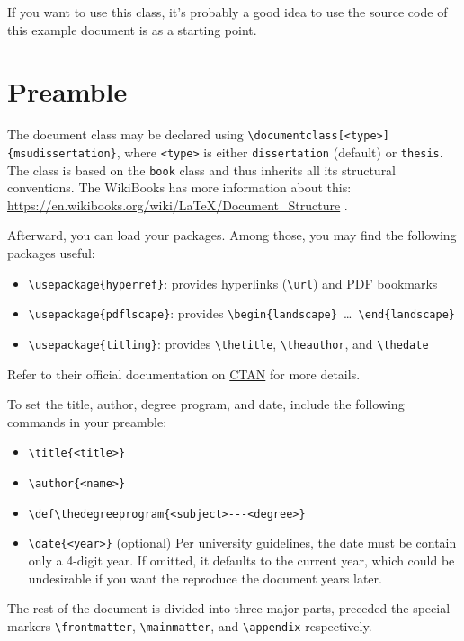\documentclass[dissertation]{msudissertation}
\def\thedegreeprogram{Underwater Basket Weaving---Doctor of Philosophy}
\begin{document}
If you want to use this class, it's probably a good idea to use the source code of this example document is as a starting point.

\section{Preamble}

The document class may be declared using \verb|\documentclass[<type>]{msudissertation}|, where \texttt{<type>} is either \texttt{dissertation} (default) or \texttt{thesis}.  The class is based on the \texttt{book} class and thus inherits all its structural conventions.  The WikiBooks has more information about this: \url{https://en.wikibooks.org/wiki/LaTeX/Document_Structure} .

Afterward, you can load your packages.  Among those, you may find the following packages useful:
\begin{itemize}
\item \verb|\usepackage{hyperref}|: provides hyperlinks (\verb|\url|) and PDF bookmarks
\item \verb|\usepackage{pdflscape}|: provides \verb|\begin{landscape} |\ldots\verb| \end{landscape}|
\item \verb|\usepackage{titling}|: provides \verb|\thetitle|, \verb|\theauthor|, and \verb|\thedate|
\end{itemize}
Refer to their official documentation on \href{https://www.ctan.org}{CTAN} for more details.

To set the title, author, degree program, and date, include the following commands in your preamble:
\begin{itemize}
\item \verb|\title{<title>}|
\item \verb|\author{<name>}|
\item \verb|\def\thedegreeprogram{<subject>---<degree>}|
\item \verb|\date{<year>}| (optional)  Per university guidelines, the date must be contain only a 4-digit year.  If omitted, it defaults to the current year, which could be undesirable if you want the reproduce the document years later.
\end{itemize}

The rest of the document is divided into three major parts, preceded the special markers \verb|\frontmatter|, \verb|\mainmatter|, and \verb|\appendix| respectively.
\end{document}
